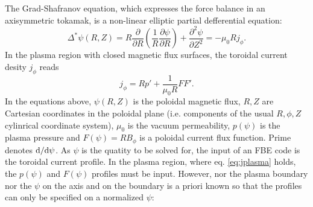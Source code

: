 The Grad-Shafranov equation, which expresses the force balance in an axisymmetric tokamak, is a non-linear elliptic partial defferential equation:
\begin{equation}
\label{eq:gs}
{\Delta ^*}\psi \left( {R,Z} \right) = R\frac{\partial }{{\partial R}}\left( {\frac{1}{R}\frac{{\partial \psi }}{{\partial R}}} \right) + \frac{{{\partial ^2}\psi }}{{\partial {Z^2}}} =  - {\mu _0}R{j_\phi }.
\end{equation}
In the plasma region with closed magnetic flux surfaces, the toroidal current desity $j_\phi$ reads
\begin{equation}
\label{eq:jplasma}
{j_\phi } = Rp' + \frac{1}{{{\mu _0}R}}FF'.
\end{equation}
In the equations above, $\psi \left( {R,Z} \right)$ is the poloidal magnetic flux, $R,Z$ are Cartesian coordinates in the poloidal plane (i.e. components of the usual $R, \phi , Z$ cylinrical coordinate system), $\mu_0$ is the vacuum permeability, $p\left(\psi\right)$ is the plasma pressure and $F\left(\psi\right) = RB_\phi$ is a poloidal current flux function.
Prime denotes ${\rm{d}}/{{\rm{d}}\psi}$. As $\psi$ is the quatity to be solved for, the input of an FBE code is the toroidal current profile. In the plasma region, where eq. \ref{eq:jplasma} holds, the $p\left(\psi\right)$ and $F\left(\psi\right)$ profiles must be input. However, nor the plasma boundary nor the $\psi$ on the axis and on the boundary is a priori known so that the profiles can only be specified on a normalized $\psi$:
